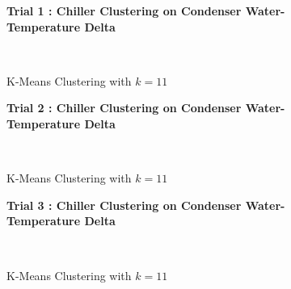 \begin{figure}[!h]
\centerline{\bfseries\Large Trial 1 : Chiller Clustering on Condenser Water-Temperature Delta}\\
\caption{K-Means Clustering with $k=11$}
\end{figure}
\begin{figure}[!h]
\centerline{\bfseries\Large Trial 2 : Chiller Clustering on Condenser Water-Temperature Delta}\\
\caption{K-Means Clustering with $k=11$}
\end{figure}
\begin{figure}[!h]
\centerline{\bfseries\Large Trial 3 : Chiller Clustering on Condenser Water-Temperature Delta}\\
\caption{K-Means Clustering with $k=11$}
\end{figure}
